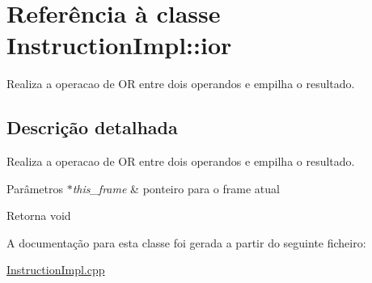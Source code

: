 \hypertarget{class_instruction_impl_1_1ior}{}\section{Referência à classe Instruction\+Impl\+:\+:ior}
\label{class_instruction_impl_1_1ior}


Realiza a operacao de OR entre dois operandos e empilha o resultado.  




\subsection{Descrição detalhada}
Realiza a operacao de OR entre dois operandos e empilha o resultado. 


\begin{DoxyParams}{Parâmetros}
{\em $\ast$this\+\_\+frame} & ponteiro para o frame atual \\
\hline
\end{DoxyParams}
\begin{DoxyReturn}{Retorna}
void 
\end{DoxyReturn}


A documentação para esta classe foi gerada a partir do seguinte ficheiro\+:\begin{DoxyCompactItemize}
\item 
\hyperlink{_instruction_impl_8cpp}{Instruction\+Impl.\+cpp}\end{DoxyCompactItemize}
